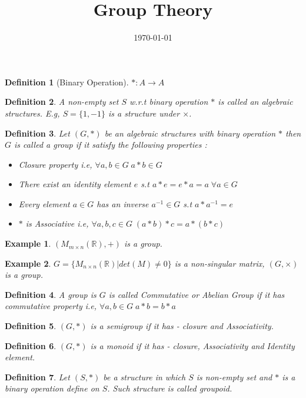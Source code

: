\documentclass[12pt,a4paper]{article}
\title{Group Theory \vspace{-2em}}
\date{\today}
\newcommand{\R}{\mathbb{R}}
\newtheorem{defn}{Definition}
\newtheorem{ex}{Example}
\begin{document}
  \maketitle
  
  \begin{defn}[Binary Operation]
  	$*: A \to A$
  \end{defn}
  
  \begin{defn}
  	A non-empty set $S$ w.r.t binary operation $*$ is called an algebraic structures. E.g, $S=\{1,-1\}$ is a structure under $\times$.
  \end{defn}
  
 \begin{defn}
 	    Let $(G,*)$ be an algebraic structures with binary operation $*$ then $G$ is called a group if it satisfy the following properties :
 	\begin{itemize}
 		\item Closure property i.e, $\forall a,b \in G\; a*b\in G$
 		\item There exist an identity element $e$ s.t $a*e=e*a=a\; \forall a\in G$
 		\item Every element $a\in G$ has an inverse $a^{-1}\in G$ s.t $a*a^{-1}=e$
 		\item $*$ is Associative i.e, $\forall a,b,c \in G\; (a*b)*c=a*(b*c)$
 	\end{itemize}
 \end{defn}
\begin{ex}
	$(M_{m\times n}(\R), +)$ is a group.
\end{ex}
\begin{ex}
	$G=\{M_{n\times n}(\R) | det(M) \ne 0 \}$ is a non-singular matrix, $(G,\times)$ is a group.
\end{ex}
\begin{defn}
	A group is $G$ is called Commutative or Abelian Group if it has commutative property i.e, $\forall a,b\in G\; a*b=b*a$
\end{defn}
\begin{defn}
	$(G,*)$ is a semigroup if it has - closure and Associativity.
\end{defn}
\begin{defn}
	$(G,*)$ is a monoid if it has - closure, Associativity and Identity element.
\end{defn}

\begin{defn}
	Let $(S,*)$ be a structure in which $S$ is non-empty set and $*$ is a binary operation define on $S$. Such structure is called groupoid.
\end{defn}
\end{document}
